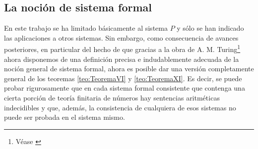 \subsection{La noción de sistema formal}
En este trabajo se ha limitado básicamente al sistema $P$ y sólo se han indicado las aplicaciones a otros sistemas. Sin embargo, como consecuencia de avances posteriores, en particular del
hecho de que gracias a la obra de A. M. Turing\footnote{Véase \cite{turing1936computable}} ahora disponemos de una definición precisa e indudablemente adecuada de la noción general de sistema formal, 
ahora es posible dar una versión completamente general de los teoremas \autoref{teo:TeoremaVI} y \autoref{teo:TeoremaXI}. Es decir, se puede probar rigurosamente que en cada sistema formal consistente 
que contenga una cierta porción de teoría finitaria de números hay sentencias aritméticas indecidibles y que, además, la consistencia de cualquiera de esos sistemas no puede ser probada en el sistema mismo.
\endinput

